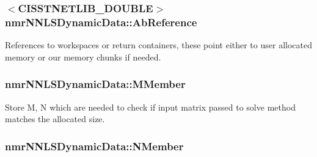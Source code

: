 \subsubsection[{Ab\+Reference}]{$<$C\+I\+S\+S\+T\+N\+E\+T\+L\+I\+B\+\_\+\+D\+O\+U\+B\+L\+E$>$ nmr\+N\+N\+L\+S\+Dynamic\+Data\+::\+Ab\+Reference\hspace{0.3cm}{\ttfamily [protected]}}\label{classnmr_n_n_l_s_dynamic_data_a4f8101cf60688294e18942fc6cfc697a}
References to workspaces or return containers, these point either to user allocated memory or our memory chunks if needed. \hypertarget{classnmr_n_n_l_s_dynamic_data_a764d62f5392d4ef010be7bf8b3fbcc4e}{}
\subsubsection[{M\+Member}]{ nmr\+N\+N\+L\+S\+Dynamic\+Data\+::\+M\+Member\hspace{0.3cm}{\ttfamily [protected]}}\label{classnmr_n_n_l_s_dynamic_data_a764d62f5392d4ef010be7bf8b3fbcc4e}
Store M, N which are needed to check if input matrix passed to solve method matches the allocated size. \hypertarget{classnmr_n_n_l_s_dynamic_data_ab6f716705212d11032677f958736a570}{}
\subsubsection[{N\+Member}]{ nmr\+N\+N\+L\+S\+Dynamic\+Data\+::\+N\+Member\hspace{0.3cm}{\ttfamily [protected]}}\label{classnmr_n_n_l_s_dynamic_data_ab6f716705212d11032677f958736a570}
\hypertarget{classnmr_n_n_l_s_dynamic_data_ae6d19a42064425d263b7c9d06a53a9d3}{}
